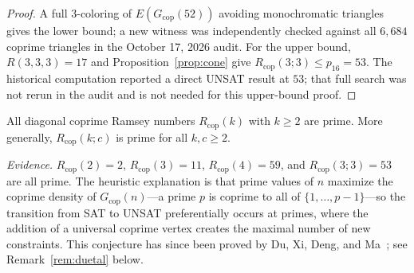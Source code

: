 \documentclass[12pt]{article}
\newcommand{\Rcop}{R_{\mathrm{cop}}}
\newcommand{\Gcop}{G_{\mathrm{cop}}}
\begin{document}
\begin{proof}
A full $3$-coloring of $E(\Gcop(52))$ avoiding monochromatic
triangles gives the lower bound; a new witness was independently
checked against all $6{,}684$ coprime triangles in the October 17, 2026
audit. For the upper bound, $R(3,3,3)=17$ and
Proposition~\ref{prop:cone} give $\Rcop(3;3)\le p_{16}=53$.
The historical computation reported a direct UNSAT result at $53$;
that full search was not rerun in the audit and is not needed for
this upper-bound proof.
\end{proof}

\begin{conjecture}\label{conj:prime}
All diagonal coprime Ramsey numbers $\Rcop(k)$ with $k \ge 2$ are
prime. More generally, $\Rcop(k;c)$ is prime for all $k, c \ge 2$.
\end{conjecture}

\noindent\emph{Evidence.} $\Rcop(2)=2$, $\Rcop(3)=11$, $\Rcop(4)=59$,
and $\Rcop(3;3)=53$ are all prime. The heuristic explanation is that
prime values of $n$ maximize the coprime density of $\Gcop(n)$---a prime
$p$ is coprime to all of $\{1,\ldots,p-1\}$---so the transition from
SAT to UNSAT preferentially occurs at primes, where the addition of a
universal coprime vertex creates the maximal number of new constraints.
This conjecture has since been proved by Du, Xi, Deng, and
Ma~\cite{du2026prime}; see Remark~\ref{rem:duetal} below.
\end{document}
